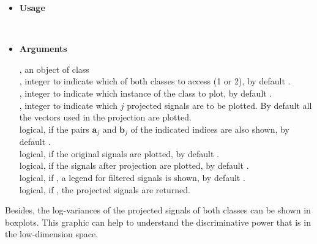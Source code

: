 \begin{itemize}
\item{\bf Usage}

\\

\item{\bf Arguments}

, an object of class \\

, integer to indicate which of both classes to access (1 or 2), by default .\\

, integer to indicate which instance of the class to plot, by default .\\

, integer to indicate which $j$ projected signals are to be plotted. By default all the vectors used in the projection are plotted.\\

 logical, if  the pairs $\mathbf{a}_j$ and $\mathbf{b}_j$ of the indicated indices are also shown, by default .\\

 logical, if  the original signals are plotted, by default .\\

	logical, if  the signals after projection are plotted, by default .\\

 	logical, if , a legend for filtered signals is shown,  by default .\\
 
  logical, if , the projected signals are returned.
\end{itemize}

\bigskip
Besides, the log-variances of the projected signals of both classes can be shown in boxplots. This graphic can help to understand the discriminative power that is in the low-dimension space.

